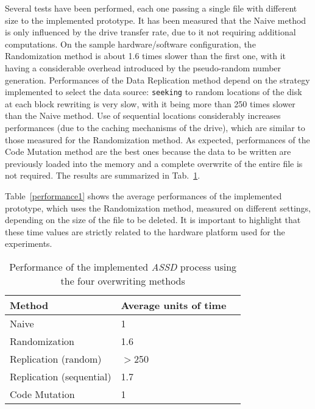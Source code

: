 \documentclass[conference]{IEEEtran}
\newcommand{\assd}{\emph{ASSD}\xspace}
\begin{document}
Several tests have been performed, each one passing a single file with different size to the implemented prototype.
It has been measured that the Naive method is only influenced by the drive transfer rate, due to it not requiring additional computations. On the sample hardware/software configuration, the Randomization method is about 1.6 times slower than the first one, with it having a considerable overhead introduced by the pseudo-random number generation. Performances of the Data Replication method depend on the strategy implemented to select the data source: \verb=seeking= to random locations of the disk at each block rewriting is very slow, with it being more than 250 times slower than the Naive method. Use of sequential locations considerably increases performances (due to the caching mechanisms of the drive), which are similar to those measured for the Randomization method. As expected, performances of the Code Mutation method are the best ones because the data to be written are previously loaded into the memory and a complete overwrite of the entire file is not required. The results are summarized in Tab.~\ref{performance}.

\noindent Table~\ref{performance1} shows the average performances of the implemented prototype, which uses the Randomization method, measured on different settings, depending on the size of the file to be deleted. It is important to highlight that these time values are strictly related to the hardware platform used for the experiments.


\begin{table}
\centering
\caption{Performance of the implemented \assd process using the four overwriting methods}
\begin{tabular}{ | l | l | l | }
\hline
\textbf{Method} & \textbf{Average units of time}\\
\hline
Naive & 1\\
\hline
Randomization & 1.6\\
\hline
Replication (random)& $>$250\\
\hline
Replication (sequential) & 1.7\\
\hline
Code Mutation & 1\\
\hline
\end{tabular}
\label{performance}
\end{table}

\balance
\end{document}
